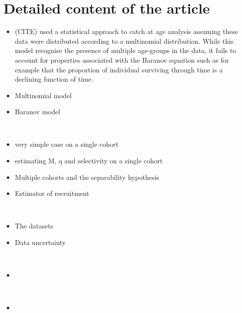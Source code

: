 \documentclass[11pt]{article}
\begin{document}
\clearpage
\newpage
\section{Detailed content of the article}


\begin{itemize}

\item (CITE) used a statistical approach to catch at age analysis assuming these data were distributed according to a multinomial distribution. While this model recognise the presence of multiple age-groups in the data, it fails to account for properties associated with the Baranov equation such as for example that the proportion of individual surviving through time is a declining function of time.
\item Multinomial model
\item Baranov model

\end{itemize}

\\

\begin{itemize}
\item very simple case on a single cohort
\item estimating M, q and selectivity on a single cohort
\item Multiple cohorts and the separability hypothesis
\item Estimator of recruitment
\end{itemize}

\\
\begin{itemize}
\item The datasets
\item Data uncertainty
\end{itemize}

\\
\begin{itemize}
\item
\end{itemize}

\\
\begin{itemize}
\item
\end{itemize}
\end{document}
